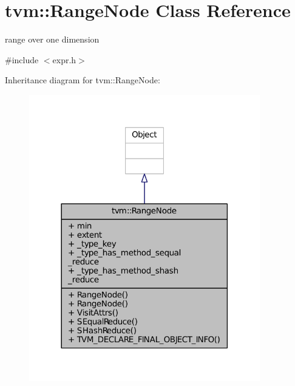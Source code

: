 \hypertarget{classtvm_1_1RangeNode}{}\section{tvm\+:\+:Range\+Node Class Reference}
\label{classtvm_1_1RangeNode}


range over one dimension  




{\ttfamily \#include $<$expr.\+h$>$}



Inheritance diagram for tvm\+:\+:Range\+Node\+:
\nopagebreak
\begin{figure}[H]
\begin{center}
\leavevmode
\includegraphics[width=285pt]{classtvm_1_1RangeNode__inherit__graph}
\end{center}
\end{figure}


